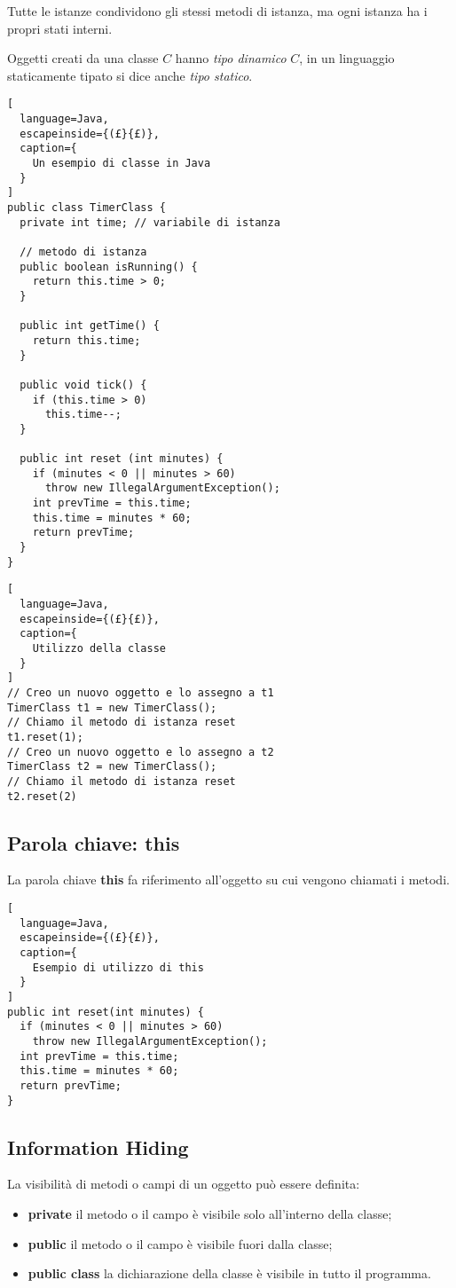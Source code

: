 Tutte le istanze condividono gli stessi metodi di istanza, ma ogni istanza ha
i propri stati interni.

Oggetti creati da una classe $C$ hanno \emph{tipo dinamico} $C$, in un
linguaggio staticamente tipato si dice anche \emph{tipo statico}.

\begin{lstlisting}[
  language=Java,
  escapeinside={(£}{£)},
  caption={
    Un esempio di classe in Java
  }
]
public class TimerClass {
  private int time; // variabile di istanza

  // metodo di istanza
  public boolean isRunning() {
    return this.time > 0;
  }

  public int getTime() {
    return this.time;
  }

  public void tick() {
    if (this.time > 0)
      this.time--;
  }

  public int reset (int minutes) {
    if (minutes < 0 || minutes > 60)
      throw new IllegalArgumentException();
    int prevTime = this.time;
    this.time = minutes * 60;
    return prevTime;
  }
}
\end{lstlisting}

\begin{lstlisting}[
  language=Java,
  escapeinside={(£}{£)},
  caption={
    Utilizzo della classe
  }
]
// Creo un nuovo oggetto e lo assegno a t1
TimerClass t1 = new TimerClass();
// Chiamo il metodo di istanza reset
t1.reset(1);
// Creo un nuovo oggetto e lo assegno a t2
TimerClass t2 = new TimerClass();
// Chiamo il metodo di istanza reset
t2.reset(2)
\end{lstlisting}

\subsection{Parola chiave: this}
La parola chiave \textbf{this} fa riferimento all'oggetto su cui vengono
chiamati i metodi.

\begin{lstlisting}[
  language=Java,
  escapeinside={(£}{£)},
  caption={
    Esempio di utilizzo di this
  }
]
public int reset(int minutes) {
  if (minutes < 0 || minutes > 60)
    throw new IllegalArgumentException();
  int prevTime = this.time;
  this.time = minutes * 60;
  return prevTime;
}
\end{lstlisting}

\subsection{Information Hiding}
La visibilità di metodi o campi di un oggetto può essere definita:
\begin{itemize}
  \item \textbf{private} il metodo o il campo è visibile solo all'interno della
    classe;
  \item \textbf{public} il metodo o il campo è visibile fuori dalla classe;
  \item \textbf{public class} la dichiarazione della classe è visibile in tutto
    il programma.
\end{itemize}

